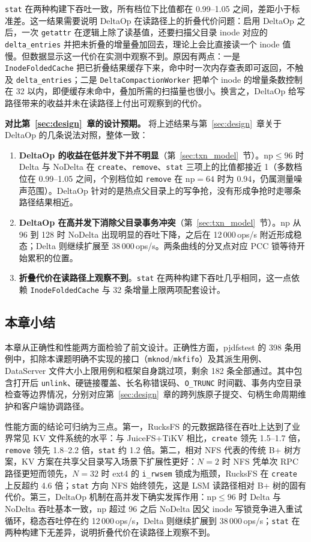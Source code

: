 \texttt{stat} 在两种构建下吞吐一致，所有档位下比值都在 0.99--1.05 之间，差距小于标准差。这一结果需要说明 DeltaOp 在读路径上的折叠代价问题：启用 DeltaOp 之后，一次 \texttt{getattr} 在逻辑上除了读基值，还要扫描父目录 inode 对应的 \texttt{delta\_entries} 并把未折叠的增量叠加回去，理论上会比直接读一个 inode 值慢。但数据显示这一代价在实测中观察不到。原因有两点：一是 \texttt{InodeFoldedCache} 把已折叠结果缓存下来，命中时一次内存查表即可返回，不触及 \texttt{delta\_entries}；二是 \texttt{DeltaCompactionWorker} 把单个 inode 的增量条数控制在 32 以内，即便缓存未命中，叠加所需的扫描量也很小。换言之，DeltaOp 给写路径带来的收益并未在读路径上付出可观察到的代价。

\textbf{对比第~\ref{sec:design}~章的设计预期。} 将上述结果与第~\ref{sec:design}~章关于 DeltaOp 的几条说法对照，整体一致：

\begin{enumerate}
    \item \textbf{DeltaOp 的收益在低并发下并不明显}（第~\ref{sec:txn_model}~节）。$\mathrm{np} \leq 96$ 时 Delta 与 NoDelta 在 \texttt{create}、\texttt{remove}、\texttt{stat} 三项上的比值都接近 1（多数档位在 0.99--1.05 之间，个别档位如 \texttt{remove} 在 $\mathrm{np}=64$ 时为 0.94，仍属测量噪声范围）。DeltaOp 针对的是热点父目录上的写争抢，没有形成争抢时走哪条路径结果相近。
    \item \textbf{DeltaOp 在高并发下消除父目录事务冲突}（第~\ref{sec:txn_model}~节）。$\mathrm{np}$ 从 96 到 128 时 NoDelta 出现明显的吞吐下降，之后在 12\,000\,ops/s 附近形成稳态；Delta 则继续扩展至 38\,000\,ops/s。两条曲线的分叉点对应 PCC 锁等待开始累积的位置。
    \item \textbf{折叠代价在读路径上观察不到}。\texttt{stat} 在两种构建下吞吐几乎相同，这一点依赖 \texttt{InodeFoldedCache} 与 32 条增量上限两项配套设计。
\end{enumerate}

\subsection{本章小结}

本章从正确性和性能两方面检验了前文设计。正确性方面，pjdfstest 的 398 条用例中，扣除本课题明确不实现的接口（\texttt{mknod}/\texttt{mkfifo}）及其派生用例、DataServer 文件大小上限用例和框架自身跳过项，剩余 182 条全部通过。其中包含打开后 \texttt{unlink}、硬链接覆盖、长名称错误码、\texttt{O\_TRUNC} 时间戳、事务内空目录检查等边界情况，分别对应第~\ref{sec:design}~章的跨列族原子提交、句柄生命周期维护和客户端协调路径。

性能方面的结论可归纳为三点。第一，RucksFS 的元数据路径在吞吐上达到了业界常见 KV 文件系统的水平：与 JuiceFS+TiKV 相比，\texttt{create} 领先 1.5--1.7 倍，\texttt{remove} 领先 1.8--2.2 倍，\texttt{stat} 约 1.2 倍。第二，相对 NFS 代表的传统 B+ 树方案，KV 方案在共享父目录写入场景下扩展性更好：$N=2$ 时 NFS 凭单次 RPC 路径更短而领先，$N=32$ 时 ext4 的 \texttt{i\_rwsem} 锁成为瓶颈，RucksFS 在 \texttt{create} 上反超约 4.6 倍；\texttt{stat} 方向 NFS 始终领先，这是 LSM 读路径相对 B+ 树的固有代价。第三，DeltaOp 机制在高并发下确实发挥作用：$\mathrm{np} \leq 96$ 时 Delta 与 NoDelta 吞吐基本一致，$\mathrm{np}$ 超过 96 之后 NoDelta 因父 inode 写锁竞争进入重试循环，稳态吞吐停在约 12\,000\,ops/s，Delta 则继续扩展到 38\,000\,ops/s；\texttt{stat} 在两种构建下无差异，说明折叠代价在读路径上观察不到。
